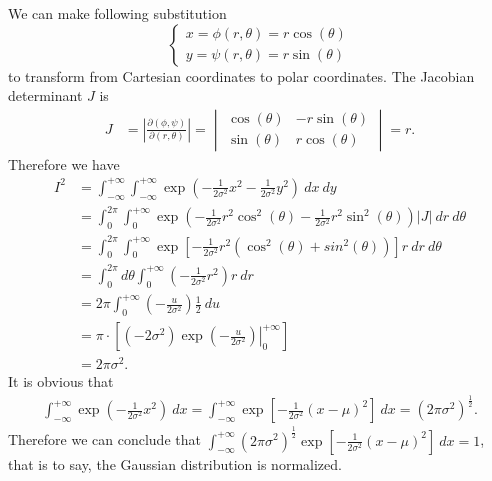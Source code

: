 \begin{answer}{}
	We can make following substitution
	\begin{equation}
		\begin{cases}
		x = \phi(r, \theta) = r\cos(\theta)\\
		y = \psi(r, \theta) = r\sin(\theta)
		\end{cases}
	\end{equation}
	to transform from Cartesian coordinates to polar coordinates. The Jacobian determinant $J$ is
	\begin{align}
		J &= \left|\frac{\partial(\phi, \psi)}{\partial(r, \theta)}\right| = 
			\begin{vmatrix}
				\cos(\theta) & -r\sin(\theta) \\
				\sin(\theta) & r\cos(\theta)
			\end{vmatrix}
		= r.
	\end{align}
	Therefore we have
	\begin{align}
		I^2 &= \int_{-\infty}^{+\infty}\int_{-\infty}^{+\infty} \exp\left(-\frac{1}{2\sigma^2}x^2 -\frac{1}{2\sigma^2}y^2\right)\ dx\ dy\\
		&= \int_{0}^{2\pi}\int_{0}^{+\infty} \exp\left(-\frac{1}{2\sigma^2}r^2\cos^2(\theta) -\frac{1}{2\sigma^2}r^2\sin^2(\theta)\right)|J|\ dr\ d\theta\\
		&= \int_{0}^{2\pi}\int_{0}^{+\infty} \exp\left[-\frac{1}{2\sigma^2}r^2\left(\cos^2(\theta) + sin^2(\theta)\right)\right]r\ dr\ d\theta\\
		&= \int_{0}^{2\pi}d\theta \int_{0}^{+\infty} \left(-\frac{1}{2\sigma^2}r^2\right)r\ dr\\
		&= 2\pi \int_{0}^{+\infty} \left(-\frac{u}{2\sigma^2}\right)\frac{1}{2}\ du\\
		&= \pi \cdot \left[\left.(-2\sigma^2)\exp\left(-\frac{u}{2\sigma^2}\right)\right\rvert_{0}^{+\infty}\right]\\
		&= 2\pi\sigma^2.
	\end{align}
	It is obvious that
	\begin{align}
		\int_{-\infty}^{+\infty} \exp\left(-\frac{1}{2\sigma^2}x^2\right)\ dx = \int_{-\infty}^{+\infty} \exp\left[-\frac{1}{2\sigma^2}(x-\mu)^2\right]\ dx = \left(2\pi\sigma^2\right)^{\frac{1}{2}}.
	\end{align}
	Therefore we can conclude that $\int_{-\infty}^{+\infty} \left(2\pi\sigma^2\right)^{\frac{1}{2}}\exp\left[-\frac{1}{2\sigma^2}(x-\mu)^2\right] \ dx = 1$, that is to say, the Gaussian distribution is normalized.
	

\end{answer}
